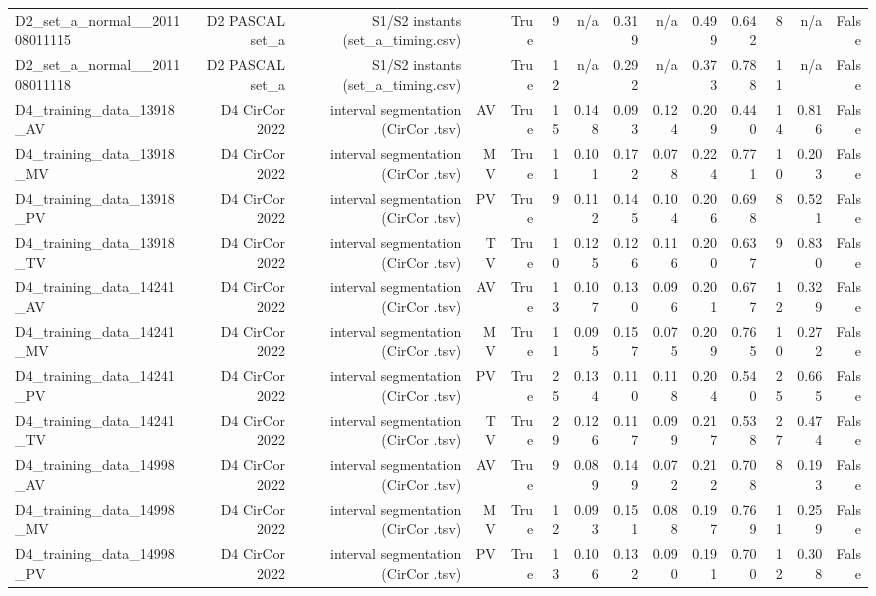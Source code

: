 \begin{table}[htbp]
\begin{tabular}{lrrrrrrrrrrrrr}
    D2\_set\_a\_normal\_\_201108011115 & D2 PASCAL set\_a & S1/S2 instants (set\_a\_timing.csv) &  & True & 9 & n/a & 0.319 & n/a & 0.499 & 0.642 & 8 & n/a & False \\
    D2\_set\_a\_normal\_\_201108011118 & D2 PASCAL set\_a & S1/S2 instants (set\_a\_timing.csv) &  & True & 12 & n/a & 0.292 & n/a & 0.373 & 0.788 & 11 & n/a & False \\
    D4\_training\_data\_13918\_AV & D4 CirCor 2022 & interval segmentation (CirCor .tsv) & AV & True & 15 & 0.148 & 0.093 & 0.124 & 0.209 & 0.440 & 14 & 0.816 & False \\
    D4\_training\_data\_13918\_MV & D4 CirCor 2022 & interval segmentation (CirCor .tsv) & MV & True & 11 & 0.101 & 0.172 & 0.078 & 0.224 & 0.771 & 10 & 0.203 & False \\
    D4\_training\_data\_13918\_PV & D4 CirCor 2022 & interval segmentation (CirCor .tsv) & PV & True & 9 & 0.112 & 0.145 & 0.104 & 0.206 & 0.698 & 8 & 0.521 & False \\
    D4\_training\_data\_13918\_TV & D4 CirCor 2022 & interval segmentation (CirCor .tsv) & TV & True & 10 & 0.125 & 0.126 & 0.116 & 0.200 & 0.637 & 9 & 0.830 & False \\
    D4\_training\_data\_14241\_AV & D4 CirCor 2022 & interval segmentation (CirCor .tsv) & AV & True & 13 & 0.107 & 0.130 & 0.096 & 0.201 & 0.677 & 12 & 0.329 & False \\
    D4\_training\_data\_14241\_MV & D4 CirCor 2022 & interval segmentation (CirCor .tsv) & MV & True & 11 & 0.095 & 0.157 & 0.075 & 0.209 & 0.765 & 10 & 0.272 & False \\
    D4\_training\_data\_14241\_PV & D4 CirCor 2022 & interval segmentation (CirCor .tsv) & PV & True & 25 & 0.134 & 0.110 & 0.118 & 0.204 & 0.540 & 25 & 0.665 & False \\
    D4\_training\_data\_14241\_TV & D4 CirCor 2022 & interval segmentation (CirCor .tsv) & TV & True & 29 & 0.126 & 0.117 & 0.099 & 0.217 & 0.538 & 27 & 0.474 & False \\
    D4\_training\_data\_14998\_AV & D4 CirCor 2022 & interval segmentation (CirCor .tsv) & AV & True & 9 & 0.089 & 0.149 & 0.072 & 0.212 & 0.708 & 8 & 0.193 & False \\
    D4\_training\_data\_14998\_MV & D4 CirCor 2022 & interval segmentation (CirCor .tsv) & MV & True & 12 & 0.093 & 0.151 & 0.088 & 0.197 & 0.769 & 11 & 0.259 & False \\
    D4\_training\_data\_14998\_PV & D4 CirCor 2022 & interval segmentation (CirCor .tsv) & PV & True & 13 & 0.106 & 0.132 & 0.090 & 0.191 & 0.700 & 12 & 0.308 & False \\

\end{tabular}
\end{table}
